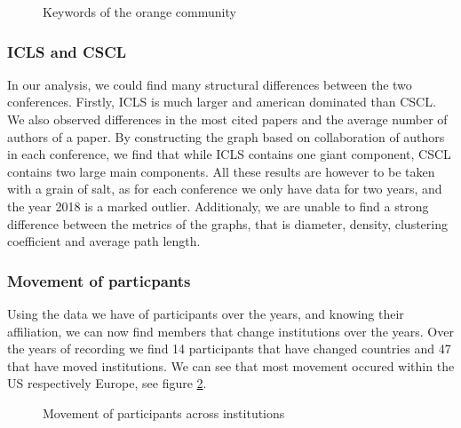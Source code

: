 \documentclass[article,twocolumn]{IEEEtran}
\begin{document}
    \begin{figure}
        \begin{center}\end{center}
        \caption{Keywords of the orange community}
        \label{c3}
    \end{figure}
    
    \hypertarget{icls-and-cscl}{%
\subsubsection{ICLS and CSCL}\label{icls-and-cscl}}

In our analysis, we could find many structural differences between the
two conferences. Firstly, ICLS is much larger and american dominated
than CSCL. We also observed differences in the most cited papers and the
average number of authors of a paper. By constructing the graph based on
collaboration of authors in each conference, we find that while ICLS
contains one giant component, CSCL contains two large main components.
All these results are however to be taken with a grain of salt, as for
each conference we only have data for two years, and the year 2018 is a
marked outlier. Additionaly, we are unable to find a strong difference
between the metrics of the graphs, that is diameter, density, clustering
coefficient and average path length.

    \hypertarget{movement-of-particpants}{%
\subsubsection{Movement of particpants}\label{movement-of-particpants}}

Using the data we have of participants over the years, and knowing their
affiliation, we can now find members that change institutions over the
years. Over the years of recording we find 14 participants that have
changed countries and 47 that have moved institutions. We can see that
most movement occured within the US respectively Europe, see figure
\ref{fig_move}.


    \begin{figure}
        \begin{center}\end{center}
        \caption{Movement of participants across institutions}
        \label{fig_move}
    \end{figure}
    
\end{document}
